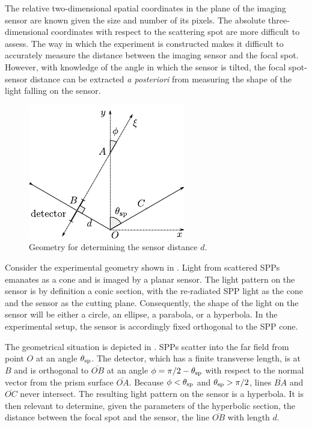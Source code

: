 The relative two-dimensional spatial coordinates in the plane of the
imaging sensor are known given the size and number of its pixels.  The
absolute three-dimensional coordinates with respect to the scattering spot
are more difficult to assess.  The way in which the experiment is
constructed makes it difficult to accurately measure the distance between
the imaging sensor and the focal spot.  However, with knowledge of the
angle in which the sensor is tilted, the focal spot-sensor distance can be extracted
\textit{a posteriori} from measuring the shape of the light falling on the
sensor.
\begin{figure}[ht]
\centering
\includegraphics[keepaspectratio,scale=1.25]{figures/hyperbolageoa.pdf}
\caption{Geometry for determining the sensor distance $d$.}
\label{fig:propgeo}
\end{figure}

Consider the experimental geometry shown in .
Light from scattered SPPs emanates as a cone and is imaged by a planar
sensor.  The light pattern on the sensor is by definition a conic section,
with the re-radiated SPP light as the cone and the sensor as the cutting
plane.  Consequently, the shape of the light on the sensor will be either a
circle, an ellipse, a parabola, or a hyperbola.  In the experimental setup,
the sensor is accordingly fixed orthogonal to the SPP cone.

The geometrical situation is depicted in .  SPPs
scatter into the far field from point $O$ at an angle $\theta_\mathrm{sp}$.  The
detector, which has a finite transverse length, is at $B$ and is orthogonal
to $\overline{OB}$ at an angle $\phi=\pi/2-\theta_\mathrm{sp}$ with respect to the
normal vector from the prism surface $\overline{OA}$.  Because
$\phi<\theta_\mathrm{sp}$ and $\theta_\mathrm{sp}>\pi/2$, lines $\overline{BA}$ and
$\overline{OC}$ never intersect. The resulting light pattern on the sensor is a hyperbola.  It is
then relevant to determine, given the parameters of the hyperbolic section,
the distance between the focal spot and the sensor, the line
$\overline{OB}$ with length $d$.

